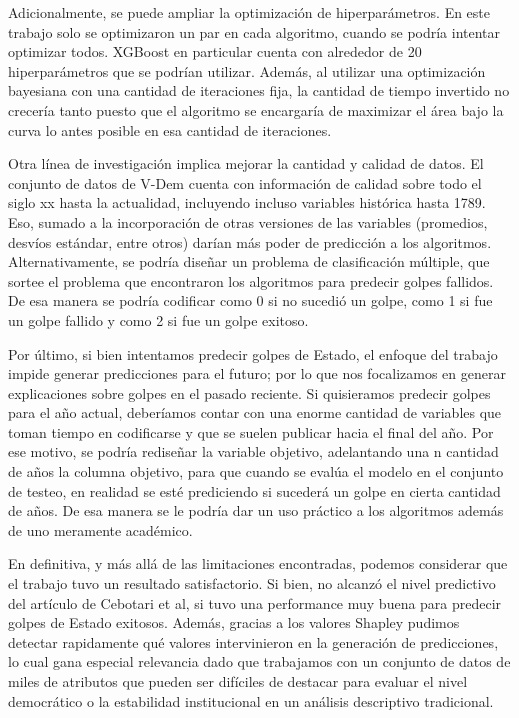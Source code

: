 \documentclass{article}
\begin{document}
Adicionalmente, se puede ampliar la optimización de hiperparámetros. En este trabajo solo se optimizaron
un par en cada algoritmo, cuando se podría intentar optimizar todos. XGBoost en particular cuenta con alrededor
de 20 hiperparámetros que se podrían utilizar. Además, al utilizar una optimización bayesiana con una cantidad
de iteraciones fija, la cantidad de tiempo invertido no crecería tanto puesto que el algoritmo se encargaría
de maximizar el área bajo la curva lo antes posible en esa cantidad de iteraciones.

Otra línea de investigación implica mejorar la cantidad y calidad de datos. El conjunto de datos de V-Dem
cuenta con información de calidad sobre todo el siglo xx hasta la actualidad, incluyendo incluso variables
histórica hasta 1789. Eso, sumado a la incorporación de otras versiones de las variables (promedios,
desvíos estándar, entre otros) darían más poder de predicción a los algoritmos. Alternativamente, se podría
diseñar un problema de clasificación múltiple, que sortee el problema que encontraron los algoritmos para 
predecir golpes fallidos. De esa manera se podría codificar como 0 si no sucedió un golpe, como 1 si fue un
golpe fallido y como 2 si fue un golpe exitoso.

Por último, si bien intentamos predecir golpes de Estado, el enfoque del trabajo impide generar
predicciones para el futuro; por lo que nos focalizamos en generar explicaciones sobre golpes en el
pasado reciente. Si quisieramos predecir golpes para el año actual, deberíamos contar con 
una enorme cantidad de variables que toman tiempo en codificarse y que se suelen publicar hacia el final del
año. Por ese motivo, se podría rediseñar la variable objetivo, adelantando una n cantidad de años la columna
objetivo, para que cuando se evalúa el modelo en el conjunto de testeo, en realidad se esté prediciendo
si sucederá un golpe en cierta cantidad de años. De esa manera se le podría dar un uso práctico a los
algoritmos además de uno meramente académico.

En definitiva, y más allá de las limitaciones encontradas, podemos considerar que el trabajo tuvo un resultado
satisfactorio. Si bien, no alcanzó el nivel predictivo del artículo de Cebotari et al, si tuvo una performance
muy buena para predecir golpes de Estado exitosos. Además, gracias a los valores Shapley pudimos detectar
rapidamente qué valores intervinieron en la generación de predicciones, lo cual
gana especial relevancia dado que trabajamos con un conjunto de datos de miles de atributos que pueden
ser difíciles de destacar para evaluar el nivel democrático o la estabilidad institucional en un análisis
descriptivo tradicional.
\end{document}
